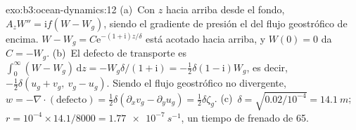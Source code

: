 \begin{solution}{exo:b3:ocean-dynamics:12}
(a)~Con $z$ hacia arriba desde el fondo, $A_zW'' = \mathrm if(W - W_g)$, siendo
el gradiente de presión el del flujo geostrófico de encima. $W - W_g =
C\mathrm e^{-(1+\mathrm i)z/\delta}$ está acotado hacia arriba, y $W(0) = 0$ da
$C = -W_g$. (b)~El defecto de transporte es $\int_0^\infty(W - W_g)\,\mathrm dz
= -W_g\delta/(1+\mathrm i) = -\tfrac12\delta(1 - \mathrm i)W_g$, es decir,
$-\tfrac12\delta(u_g + v_g,\ v_g - u_g)$. Siendo el flujo geostrófico
no divergente, $w = -\nabla\cdot(\text{defecto}) = \tfrac12\delta(\partial_x
v_g - \partial_y u_g) = \tfrac12\delta\zeta_g$. (c)~$\delta =
\sqrt{0.02/10^{-4}} = \qty{14.1}{m}$; $r = 10^{-4}\times14.1/8000 =
\qty{1.77e-7}{s^{-1}}$, un tiempo de frenado de \num{65}.
\end{solution}

